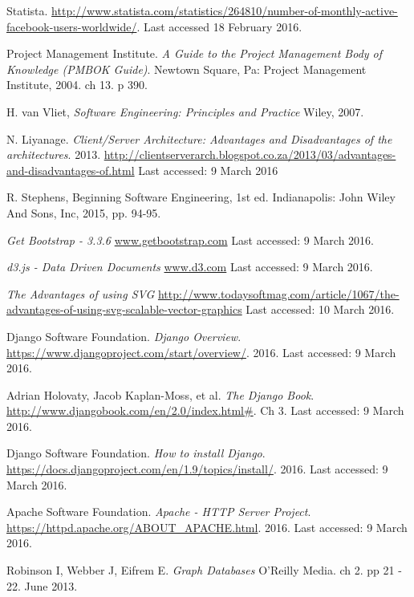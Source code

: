 \documentclass[12pt,onecolumn]{article}
\begin{document}
	
	\begin{thebibliography}{1}
		 Statista. \url {http://www.statista.com/statistics/264810/number-of-monthly-active-facebook-users-worldwide/}. Last accessed 18 February 2016. 
		
		 Project Management Institute. \emph{A Guide to the Project Management Body of Knowledge (PMBOK Guide)}. Newtown Square, Pa: Project Management Institute, 2004. ch 13. p 390.
		
		 H. van Vliet, \emph{Software Engineering: Principles and Practice} Wiley, 2007.
		
		 N. Liyanage. \emph{Client/Server Architecture: Advantages and Disadvantages of the architectures}. 2013. \url{http://clientserverarch.blogspot.co.za/2013/03/advantages-and-disadvantages-of.html} Last accessed: 9 March 2016
		
		 R. Stephens, Beginning Software Engineering, 1st ed. Indianapolis: John Wiley And Sons, Inc, 2015, pp. 94-95.
		
		  \emph{Get Bootstrap - 3.3.6} \url{www.getbootstrap.com} Last accessed: 9 March 2016.
		
		  \emph{d3.js - Data Driven Documents} \url{www.d3.com} Last accessed: 9 March 2016.
		
		  \emph{The Advantages of using SVG} \url{http://www.todaysoftmag.com/article/1067/the-advantages-of-using-svg-scalable-vector-graphics} Last accessed: 10 March 2016.
		
		 Django Software Foundation. \emph{Django Overview}. \url{https://www.djangoproject.com/start/overview/}. 2016. Last accessed: 9 March 2016. 
		
		 Adrian Holovaty, Jacob Kaplan-Moss, et al. \emph{The Django Book}. \url{http://www.djangobook.com/en/2.0/index.html#}. Ch 3. Last accessed: 9 March 2016.
		
		 Django Software Foundation. \emph{How to install Django}. \url{https://docs.djangoproject.com/en/1.9/topics/install/}. 2016. Last accessed: 9 March 2016.	
		
		 Apache Software Foundation. \emph{Apache - HTTP Server Project}. \url{https://httpd.apache.org/ABOUT_APACHE.html}. 2016. Last accessed: 9 March 2016.	
		
		 Robinson I, Webber J, Eifrem E. \emph{Graph Databases} O'Reilly Media. ch 2. pp 21 - 22. June 2013.
		

\end{thebibliography}
\end{document}
